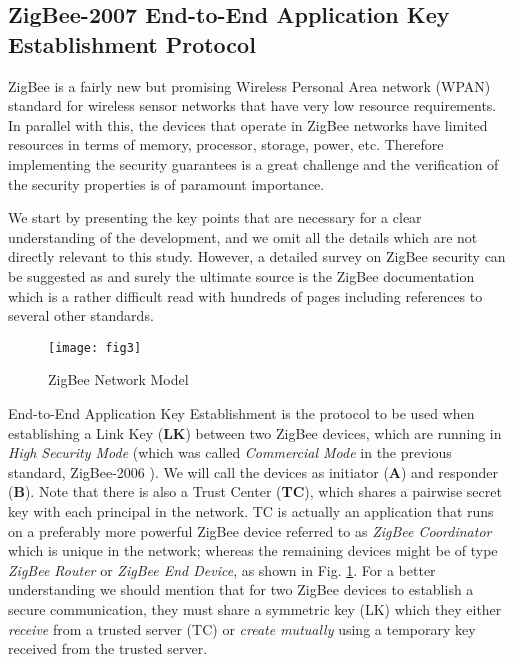 \subsection{ZigBee-2007 End-to-End Application Key Establishment Protocol}
\label{zig:keyest}
ZigBee is a fairly new but promising Wireless Personal Area network (WPAN) standard for wireless sensor
networks
that have very low resource requirements. In parallel with this, the devices that operate in
ZigBee networks have limited resources in terms of memory, processor,
storage, power, etc. Therefore
implementing the security guarantees is a great challenge and the
verification of the security properties is of paramount importance.

We start by presenting the key points that are necessary for a clear understanding of the development, and we omit all the details which are not directly relevant to this study. However, a detailed survey on ZigBee security can be suggested as \cite{Yuksel:Nielson} and surely the ultimate source is the ZigBee documentation \cite{ZigBee:2007, ZigBee:Stack, ZigBeePRO:Stack, ZigBee:HA, ZigBee:SE} which is a rather difficult read with hundreds of pages including references to several other standards.

\begin{figure}[!htp]
\centering
\texttt{[image: fig3]}
\caption{ZigBee Network Model}
\label{fig:znet}
\end{figure}
End-to-End Application Key Establishment is the protocol to be used when establishing a Link Key (\textbf{LK}) between two ZigBee devices, 
which are running in \emph{High Security Mode} (which was called \emph{Commercial Mode} in the previous standard, ZigBee-2006 \cite{ZigBee:2006}). 
We will call the devices as initiator (\textbf{A}) and responder (\textbf{B}). 
Note that there is also a Trust Center (\textbf{TC}), which shares a pairwise secret key with each principal in the network. 
TC is actually an application that runs on a preferably more powerful ZigBee device referred to as \emph{ZigBee Coordinator} which is unique in the network; 
whereas the remaining devices might be of type \emph{ZigBee Router} or \emph{ZigBee End Device}, as shown in Fig. \ref{fig:znet}.
For a better understanding we should mention that for two ZigBee devices to establish a secure communication, 
they must share a symmetric key (LK) which they either \emph{receive} from a trusted server (TC) 
or \emph{create mutually} using a temporary key received from the trusted server.

